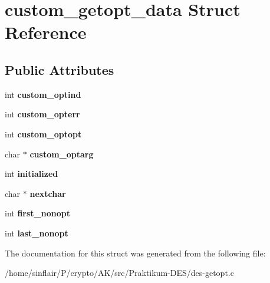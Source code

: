 \hypertarget{structcustom__getopt__data}{}\section{custom\+\_\+getopt\+\_\+data Struct Reference}
\label{structcustom__getopt__data}
\subsection*{Public Attributes}
\begin{DoxyCompactItemize}
\item 
\mbox{\label{structcustom__getopt__data_a708838699338a902634d6040f61c9d1e}} 
int {\bfseries custom\+\_\+optind}
\item 
\mbox{\label{structcustom__getopt__data_a70368029b9189c6af100d41b95a2a853}} 
int {\bfseries custom\+\_\+opterr}
\item 
\mbox{\label{structcustom__getopt__data_ad986661b4b79755fd55f9f10303221e0}} 
int {\bfseries custom\+\_\+optopt}
\item 
\mbox{\label{structcustom__getopt__data_a09e50973b9ce49fa0bfa62bb06289f32}} 
char $\ast$ {\bfseries custom\+\_\+optarg}
\item 
\mbox{\label{structcustom__getopt__data_a5952791becb49374ddfc8726bbf94910}} 
int {\bfseries initialized}
\item 
\mbox{\label{structcustom__getopt__data_a83f042e31dab41b17d8238b528e06121}} 
char $\ast$ {\bfseries nextchar}
\item 
\mbox{\label{structcustom__getopt__data_a89f56362160b74f59aa39d8838dd8bb8}} 
int {\bfseries first\+\_\+nonopt}
\item 
\mbox{\label{structcustom__getopt__data_aff78193409ca6ea017ced550453e0cfd}} 
int {\bfseries last\+\_\+nonopt}
\end{DoxyCompactItemize}


The documentation for this struct was generated from the following file\+:\begin{DoxyCompactItemize}
\item 
/home/sinflair/\+P/crypto/\+A\+K/src/\+Praktikum-\/\+D\+E\+S/des-\/getopt.\+c\end{DoxyCompactItemize}
